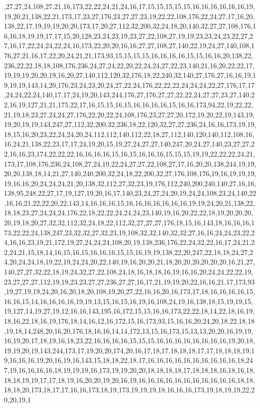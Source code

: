 ,27,27,24,108,27,21,16,173,22,22,24,21,24,16,17,15,15,15,15,15,16,16,16,16,16,16,19,19,20,21,138,22,21,173,17,23,27,176,23,27,27,23,19,22,22,108,176,22,24,27,17,16,20,138,22,17,19,19,19,20,20,173,17,20,27,112,32,200,32,24,18,20,140,32,27,27,108,176,16,16,18,19,19,17,17,15,20,128,23,24,23,19,23,27,22,108,27,19,19,23,23,24,23,22,27,27,16,17,22,24,24,22,24,16,173,22,20,20,16,16,27,27,108,27,140,22,19,24,27,140,108,176,27,21,16,17,22,20,24,21,21,173,93,15,15,15,15,16,16,16,16,15,15,16,16,20,138,22,236,22,22,18,18,108,176,236,24,27,24,22,20,22,24,24,27,22,23,140,21,16,20,22,22,17,19,19,19,20,20,19,16,20,27,140,112,120,32,176,18,22,240,32,140,27,176,27,16,16,19,19,19,19,143,14,20,176,23,24,23,20,24,27,22,24,176,22,22,22,24,24,24,22,27,176,17,17,24,24,22,24,140,17,17,24,19,20,143,244,176,27,176,27,27,22,22,24,27,27,23,27,140,22,16,19,127,21,21,175,22,17,16,15,15,16,15,16,16,16,16,15,16,16,173,94,22,19,22,22,21,19,18,23,27,24,24,27,176,22,20,22,24,108,176,23,27,27,20,172,19,20,22,19,143,19,19,20,19,19,143,247,27,112,32,200,32,236,18,22,120,32,27,27,236,24,16,16,173,19,19,18,15,16,20,23,22,24,24,20,24,112,112,140,112,22,18,27,112,140,120,140,112,108,16,16,24,21,138,22,23,17,17,24,19,20,15,19,27,24,27,27,140,247,20,24,27,140,23,27,27,22,16,16,23,174,22,22,22,16,16,16,16,15,16,15,16,16,16,15,15,15,19,19,22,22,22,24,21,173,17,108,176,236,24,108,27,24,19,22,24,27,27,22,108,27,17,16,20,20,138,244,19,19,20,20,138,18,14,21,27,140,240,200,32,24,18,22,200,32,27,176,108,176,19,16,19,19,19,19,16,16,20,24,24,24,21,20,138,32,112,27,32,23,19,176,112,240,200,240,140,27,16,16,138,95,248,22,27,17,19,127,19,20,16,17,140,23,24,27,24,20,19,24,24,108,23,24,140,22,16,16,21,22,22,20,22,143,14,16,16,16,15,16,16,16,16,16,16,16,19,19,24,20,21,138,22,18,18,23,27,24,24,24,176,22,18,22,22,24,24,24,23,140,19,16,20,22,22,18,19,20,20,20,20,19,18,20,27,32,32,112,32,24,18,22,112,32,27,27,27,176,18,15,16,143,18,16,16,16,173,22,22,24,138,247,23,32,32,27,32,23,19,108,32,32,140,32,32,27,16,16,24,24,23,22,24,16,16,23,19,21,172,19,27,24,24,24,108,20,19,138,236,176,22,24,32,22,16,17,24,21,22,24,21,15,18,14,16,15,16,15,16,16,16,15,15,16,19,19,138,22,20,247,22,18,18,24,27,24,20,24,24,18,19,22,19,24,24,20,22,140,19,16,20,20,21,18,20,20,20,20,20,20,16,21,27,140,27,27,32,22,18,19,24,32,27,22,108,24,18,16,18,18,16,19,16,16,20,24,24,22,22,19,23,27,27,27,112,19,19,23,23,27,27,236,27,27,16,17,21,19,19,20,22,16,16,21,17,173,93,19,27,19,19,24,20,16,20,18,20,108,19,20,27,22,16,16,20,16,173,17,18,16,16,16,16,15,16,16,15,14,16,16,16,16,19,19,13,15,16,15,16,19,16,108,24,19,16,138,18,15,19,19,15,19,127,14,19,27,19,12,16,16,143,195,16,172,15,15,16,16,173,22,22,18,14,22,18,16,19,18,16,22,18,16,19,176,18,14,16,12,16,172,15,16,173,93,15,16,16,20,24,20,18,22,18,18,19,18,14,248,20,16,20,176,18,16,16,14,14,172,13,15,16,173,15,13,13,20,20,16,19,19,16,19,20,17,18,19,16,18,23,22,16,16,16,16,15,15,15,16,16,16,16,16,16,16,16,19,20,18,19,19,20,19,143,244,173,17,19,20,20,174,20,16,17,18,17,18,18,18,17,17,18,18,18,19,19,16,16,16,19,20,16,19,16,143,15,18,18,22,18,17,16,16,16,16,16,16,16,16,16,16,18,247,19,16,16,16,16,18,19,19,19,16,173,19,19,20,20,18,18,18,18,17,18,18,18,16,18,16,18,18,18,19,19,17,17,18,19,16,20,20,19,20,16,19,16,16,16,16,16,16,16,16,16,16,16,18,18,18,18,20,173,18,17,17,16,16,173,18,19,173,19,19,19,18,16,16,16,173,19,18,19,19,22,20,20,19,1